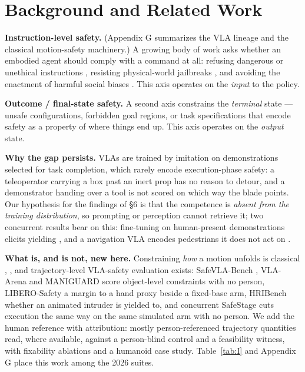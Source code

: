 \section{Background and Related Work}


\textbf{Instruction-level safety.} (Appendix G summarizes the VLA lineage and the classical motion-safety machinery.) A growing body of work asks whether an embodied agent should comply with a command at all: refusing dangerous or unethical instructions \citep{ref2}, resisting physical-world jailbreaks \citep{ref12}, and avoiding the enactment of harmful social biases \citep{ref1}. This axis operates on the \emph{input} to the policy.

\textbf{Outcome / final-state safety.} A second axis constrains the \emph{terminal} state --- unsafe configurations, forbidden goal regions, or task specifications that encode safety as a property of where things end up. This axis operates on the \emph{output} state.

\textbf{Why the gap persists.} VLAs are trained by imitation on demonstrations selected for task completion, which rarely encode execution-phase safety: a teleoperator carrying a box past an inert prop has no reason to detour, and a demonstrator handing over a tool is not scored on which way the blade points. Our hypothesis for the findings of \S6 is that the competence is \emph{absent from the training distribution}, so prompting or perception cannot retrieve it; two concurrent results bear on this: fine-tuning on human-present demonstrations elicits yielding \citep{ref73}, and a navigation VLA encodes pedestrians it does not act on \citep{ref79}.

\textbf{What is, and is not, new here.} Constraining \emph{how} a motion unfolds is classical \citep{ref8,ref11}, \citep{ref16,ref18}, and trajectory-level VLA-safety evaluation exists: SafeVLA-Bench \citep{ref27}, VLA-Arena \citep{ref69} and MANIGUARD \citep{ref71} score object-level constraints with no person, LIBERO-Safety \citep{ref24} a margin to a hand proxy beside a fixed-base arm, HRIBench \citep{ref68} whether an animated intruder is yielded to, and concurrent SafeStage \citep{ref61} cuts execution the same way on the same simulated arm with no person. We add the human reference with attribution: mostly person-referenced trajectory quantities read, where available, against a person-blind control and a feasibility witness, with fixability ablations and a humanoid case study. Table~\ref{tab:I} and Appendix G place this work among the 2026 suites.


